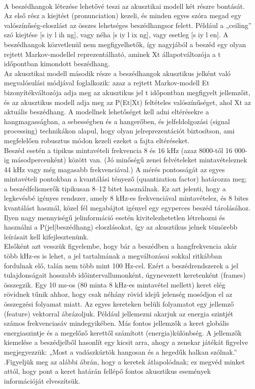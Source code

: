 \documentclass[a4paper,12pt]{paper}
\begin{document}
\\A beszédhangok létezése lehetővé teszi az akusztikai modell két részre bontását. Az első rész a kiejtést (pronunciation) kezeli, és minden egyes szóra megad egy valószínűség-eloszlást az összes lehetséges beszédhangsor felett. Például a „ceiling” szó kiejtése [s iy l ih ng], vagy néha [s iy l ix ng], vagy esetleg [s iy l en]. A beszédhangok közvetlenül nem megfigyelhetők, így nagyjából a beszéd egy olyan rejtett Markov-modellel reprezentálható, aminek Xt állapotváltozója a t időpontban kimondott beszédhang.
\\Az akusztikai modell második része a beszédhangok akusztikus jelként való megvalósulási módjával foglalkozik: azaz a rejtett Markov-modell Et bizonyítékváltozója adja meg az akusztikus jel t időpontban megfigyelt jellemzőit, és az akusztikus modell adja meg az P(Et|Xt) feltételes valószínűséget, ahol Xt az aktuális beszédhang. A modellnek lehetőséget kell adni eltérésekre a hangmagasságban, a sebességben és a hangerőben, és jelfeldolgozási (signal processing) technikákon alapul, hogy olyan jelreprezentációt biztosítson, ami megfelelően robusztus módon kezeli ezeket a fajta eltéréseket.
\\Beszéd esetén a tipikus mintavételi frekvencia 8 és 16 kHz (azaz 8000-től 16 000-ig másodpercenként) között van. (Jó minőségű zenei felvételeket mintavételeznek 44 kHz vagy még magasabb frekvenciával.) A mérés pontosságát az egyes mintavételi pontokban a kvantálási tényező (quantization factor) határozza meg; a beszédfelismerők tipikusan 8–12 bitet használnak. Ez azt jelenti, hogy a legkevésbé igényes rendszer, amely 8 kHz-es frekvenciával mintavételez, és 8 bites kvantálást használ, közel fél megabájtot igényel egy egyperces beszéd tárolásához. Ilyen nagy mennyiségű jelinformáció esetén kivitelezhetetlen létrehozni és használni a P(jel|beszédhang) eloszlásokat, így az akusztikus jelnek tömörebb leírásait kell kifejlesztenünk.
\\Elsőként azt vesszük figyelembe, hogy bár a beszédben a hangfrekvencia akár több kHz-es is lehet, a jel tartalmának a megváltozásai sokkal ritkábban fordulnak elő, talán nem több mint 100 Hz-cel. Ezért a beszédrendszerek a jel tulajdonságait hosszabb időintervallumonként, úgynevezett keretenként (frames) összegzik. Egy 10 ms-os (80 minta 8 kHz-es mintavétel mellett) keret elég rövidnek tűnik ahhoz, hogy csak néhány rövid idejű jelenség mosódjon el az összegzési folyamat miatt. Az egyes kereteken belüli folyamatot egy jellemző (feature) vektorral ábrázoljuk. Például jellemezni akarjuk az energia szintjét számos frekvenciasáv mindegyikében. Más fontos jellemzők a keret globális energiaszintje és a megelőző kerettől számított (energia)különbség. A jellemzők kiemelése a beszédjelből hasonlít egy kicsit arra, ahogy a zenekar játékát figyelve megjegyezzük: „Most a vadászkürtök hangosan és a hegedűk halkan szólnak.” .Figyeljük meg az alábbi ábrán, hogy a keretek átlapolódnak; ez megvéd minket attól, hogy pont a keret határán fellépő fontos akusztikus események információját elveszítsük.
\end{document}
